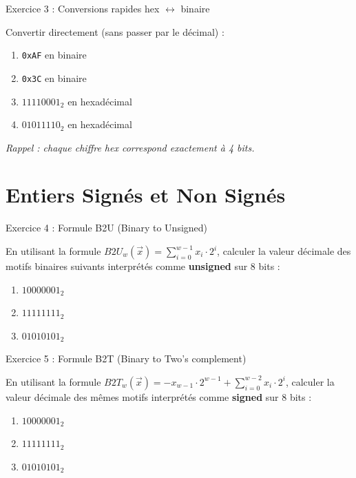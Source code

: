 \documentclass[10pt,a4paper]{article}
\begin{document}
\begin{exercicebox}{Exercice 3 : Conversions rapides hex $\leftrightarrow$ binaire}

Convertir directement (sans passer par le décimal) :

\begin{enumerate}[label=\alph*)]
    \item \texttt{0xAF} en binaire
    \item \texttt{0x3C} en binaire
    \item $11110001_2$ en hexadécimal
    \item $01011110_2$ en hexadécimal
\end{enumerate}

\textit{Rappel : chaque chiffre hex correspond exactement à 4 bits.}
\end{exercicebox}

\section{Entiers Signés et Non Signés}

\begin{exercicebox}{Exercice 4 : Formule B2U (Binary to Unsigned)}

En utilisant la formule $B2U_w(\vec{x}) = \sum_{i=0}^{w-1} x_i \cdot 2^i$, calculer la valeur décimale des motifs binaires suivants interprétés comme \textbf{unsigned} sur 8 bits :

\begin{enumerate}[label=\alph*)]
    \item $10000001_2$
    \item $11111111_2$
    \item $01010101_2$
\end{enumerate}
\end{exercicebox}

\begin{exercicebox}{Exercice 5 : Formule B2T (Binary to Two's complement)}

En utilisant la formule $B2T_w(\vec{x}) = -x_{w-1} \cdot 2^{w-1} + \sum_{i=0}^{w-2} x_i \cdot 2^i$, calculer la valeur décimale des mêmes motifs interprétés comme \textbf{signed} sur 8 bits :

\begin{enumerate}[label=\alph*)]
    \item $10000001_2$
    \item $11111111_2$
    \item $01010101_2$
\end{enumerate}
\end{exercicebox}
\end{document}
